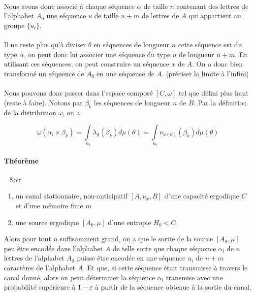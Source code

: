 \documentclass[a4paper,12pt]{article}
\begin{document}
	\paragraph{}
	Nous avons donc associé à chaque séquence $\alpha$ de taille $n$ contenant des lettres de l'alphabet $A_0$ une séquence $u$ de taille $n+m$ de
	lettres de $A$ qui appartient au groupe $\{u_i\}$. 
	
	\paragraph{}
	Il ne reste plus qu'à diviser $\theta$ en séquences de longueur $n$ cette séquence est du type $\alpha$, on peut donc lui 
	associer une séquence du type $u$ de longueur $n+m$. En utilisant ces séquences, on peut construire un séquence $x$ de $A$. On a donc bien transformé
	un séquence de $A_0$ en une séquence de $A$. (préciser la limite à l'infini)
	
	\paragraph{}
	Nous pouvons donc passer dans l'espace composé $[C,\omega]$ tel que défini plus haut (reste à faire). Notons par $\beta_k$ les séquences de longueur $n$ de $B$.
	Par la définition de la distribution $\omega$, on a 
	
	\[\omega(\alpha_i\times\beta_k)=\int\limits_{\alpha_i}\lambda_0(\beta_k)d\mu(\theta)=\int\limits_{\alpha_i}\nu_{x(\theta)}(\beta_k)d\mu(\theta)\]
	
	\paragraph{Théorème}\ 
	\newline
	Soit 
	\begin{enumerate}
		\item un canal stationnaire, non-anticipatif $[A,\nu_x,B]$ d'une capacité ergodique $C$ et d'une mémoire finie $m$
		\item une source ergodique $[A_0,\mu]$ d'une entropie $H_0<C$.
	\end{enumerate}
	Alors pour tout $n$ suffisamment grand, on a que le sortie de la source $[A_0,\mu]$ peu être encodée dans l'alphabet $A$ de telle sorte que
	chaque séquence $\alpha_i$ de $n$ lettres de l'alphabet $A_0$ puisse être encodée en une séquence $u_i$ de $n+m$ caractères de l'alphabet $A$. 
	Et que, si cette séquence était transmisse à travers le canal donné, alors on peut déterminer la séquence $\alpha_i$ transmise avec une probabilité 
	supérieure à $1-\varepsilon$ à partir de la séquence obtenue à la sortie du canal.
\end{document}
